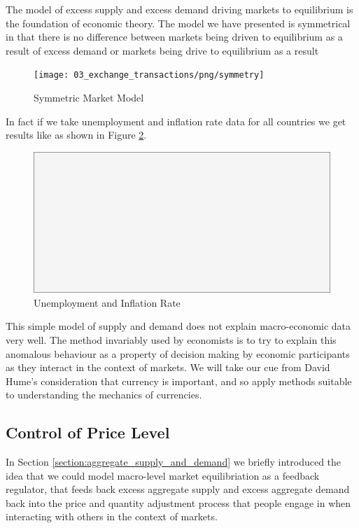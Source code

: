 The model of excess supply and excess demand driving markets to equilibrium is the foundation of
economic theory. The model we have presented is symmetrical in that there is no difference between
markets being driven to equilibrium as a result of excess demand or markets being drive to
equilibrium as a result  

\begin{figure}[H]
\centering
\texttt{[image: 03\_exchange\_transactions/png/symmetry]}
\caption{Symmetric Market Model}
\label{fig:symmetric_market_model}
\end{figure}

In fact if we take unemployment and inflation rate data for all countries we get results like as
shown in Figure \ref{fig:ui_summary}.

\begin{figure}[H]
\centering
\includegraphics[scale=0.48]{blank}
\caption{Unemployment and Inflation Rate}
\label{fig:ui_summary}
\end{figure}

This simple model of supply and demand does not explain macro-economic data very well. The method
invariably used by economists is to try to explain this anomalous behaviour as a property of
decision making by economic participants as they interact in the context of markets. We will take
our cue from David Hume's consideration that currency is important, and so apply methods suitable to
understanding the mechanics of currencies.

\subsection{Control of Price Level}
\label{subsection:control_of_price_level}

In Section \ref{section:aggregate_supply_and_demand} we briefly introduced the idea that we could model
macro-level market equilibriation as a feedback regulator, that feeds back excess aggregate supply
and excess aggregate demand back into the price and quantity adjustment process that people engage
in when interacting with others in the context of markets. 

